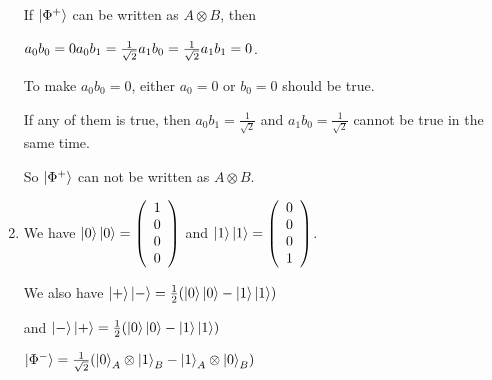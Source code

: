 \documentclass{article}
\begin{document}
\begin{enumerate}
          If $\ket{\Phi^+}$ can be written as $A\otimes B$, then

          $a_0b_0=0\\a_0b_1=\frac{1}{\sqrt{2}}\\a_1b_0=\frac{1}{\sqrt{2}}\\a_1b_1=0$.

          To make $a_0b_0=0$, either $a_0=0$ or $b_0=0$ should be true.

          If any of them is true, then $a_0b_1=\frac{1}{\sqrt{2}}$ and $a_1b_0=\frac{1}{\sqrt{2}}$ cannot be true in the same time.

          So $\ket{\Phi^+}$ can not be written as $A\otimes B$.
    \item We have $\ket{0}\ket{0}=\left(\begin{array}{c}
                      1 \\0\\0\\0
                  \end{array}\right)$ and $\ket{1}\ket{1}=\left(\begin{array}{c}
                      0 \\0\\0\\1
                  \end{array}\right)$.

          We also have
          $\ket{+}\ket{-}=\frac{1}{2}(\ket{0}\ket{0}-\ket{1}\ket{1})$

          and $\ket{-}\ket{+}=\frac{1}{2}(\ket{0}\ket{0}-\ket{1}\ket{1})$

          $\ket{\Phi^-}=\frac{1}{\sqrt{2}}(\ket{0}_A\otimes\ket{1}_B-\ket{1}_A\otimes\ket{0}_B)$


\end{enumerate}
\end{document}
